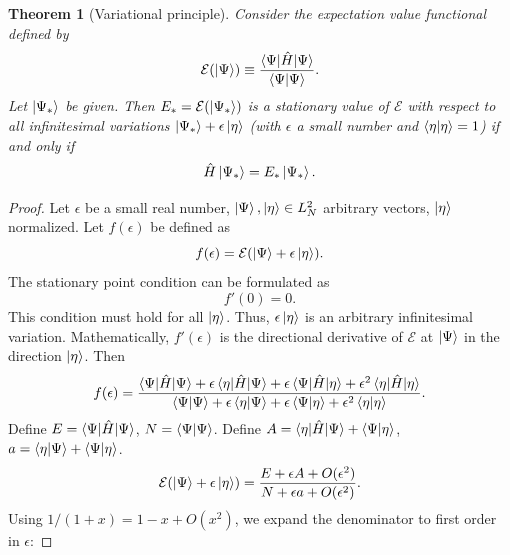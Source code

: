 \documentclass{report}
\theoremstyle{plain}
\newtheorem{theorem}{Theorem}[chapter]
\theoremstyle{definition}
\begin{document}
\begin{theorem}[Variational principle]\label{thm:vp}
  Consider the \emph{expectation value functional} defined by
  \begin{equation}
    \mathcal{E}(\ket{\Psi}) \equiv
    \frac{\braket{\Psi|\hat{H}|\Psi}}{\braket{\Psi|\Psi}}.
  \end{equation}
  Let $\ket{\Psi_*}$ be given. Then $E_* = \mathcal{E}(\ket{\Psi_*})$
  is a stationary value of $\mathcal{E}$ with respect to all infinitesimal variations
  $\ket{\Psi_*} + \epsilon\ket{\eta}$ (with $\epsilon$ a small number
  and $\braket{\eta|\eta}=1$)
  if and only
  if
  \begin{equation}
    \hat{H}\ket{\Psi_*} = E_* \ket{\Psi_*}.
  \end{equation}
\end{theorem}
\begin{proof}
  Let $\epsilon$ be a small real number, $\ket{\Psi}, \ket{\eta} \in L^2_N$
  arbitrary vectors, $\ket{\eta}$ normalized. Let $f(\epsilon)$ be defined as
  \begin{equation}
    f(\epsilon) = \mathcal{E}(\ket{\Psi} + \epsilon\ket{\eta}).
  \end{equation}
  The stationary point condition can be formulated
  as
  \begin{equation}
    f'(0) = 0.
  \end{equation}
  This condition must hold for all $\ket{\eta}$. Thus,
  $\epsilon\ket{\eta}$ is an arbitrary infinitesimal
  variation. Mathematically, $f'(\epsilon)$ is the directional
  derivative of $\mathcal{E}$ at $\ket{\Psi}$ in the direction $\ket{\eta}$.
  Then
  \begin{equation}
    f(\epsilon) = \frac{\braket{\Psi|\hat{H}|\Psi} +
      \epsilon\braket{\eta|\hat{H}|\Psi} +
      \epsilon\braket{\Psi|\hat{H}|\eta} + \epsilon^2
      \braket{\eta|\hat{H}|\eta}}{\braket{\Psi|\Psi} +
      \epsilon\braket{\eta|\Psi} + \epsilon\braket{\Psi|\eta} +
      \epsilon^2\braket{\eta|\eta}}.
  \end{equation}
  Define $E = \braket{\Psi|\hat{H}|\Psi}$, $N = \braket{\Psi|\Psi}$.
  Define $A = \braket{\eta|\hat{H}|\Psi} + \braket{\Psi|\eta}$, $a =
  \braket{\eta|\Psi} + \braket{\Psi|\eta}$.
  \begin{equation}
    \mathcal{E}(\ket{\Psi} + \epsilon\ket{\eta}) =
    \frac{E + \epsilon A + O(\epsilon^2)}{N + \epsilon a + O(\epsilon^2)}.
  \end{equation}
  Using $1/(1 + x) = 1 - x + O(x^2)$, we expand the
  denominator to first order in $\epsilon$:

\end{proof}
\end{document}
